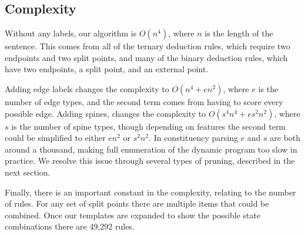 \subsection{Complexity}

Without any labels, our algorithm is $O(n^4)$, where $n$ is the length of the sentence.
This comes from all of the ternary deduction rules, which require two endpoints and two split points, and many of the binary deduction rules, which have two endpoints, a split point, and an external point.

Adding edge labels changes the complexity to $O(n^4 + e n^2)$, where $e$ is the number of edge types, and the second term comes from having to score every possible edge.
Adding spines, changes the complexity to $O(s^4 n^4 + e s^2 n^2)$, where $s$ is the number of spine types, though depending on features the second term could be simplified to either $e n^2$ or $s^2 n^2$.
In constituency parsing $e$ and $s$ are both around a thousand, making full enumeration of the dynamic program too slow in practice.
We resolve this issue through several types of pruning, described in the next section.

Finally, there is an important constant in the complexity, relating to the number of rules.
For any set of split points there are multiple items that could be combined.
Once our templates are expanded to show the possible state combinations there are 49,292 rules.

